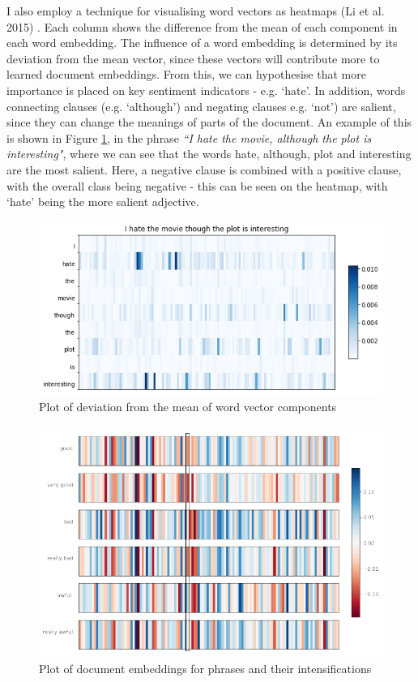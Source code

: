 \documentclass[a4paper]{article}
\begin{document}
\begin{multicols}{2}
I also employ a technique for visualising word vectors as heatmaps (Li et al. 2015) \cite{viz}. Each column shows the difference from the mean of each component in each word embedding. The influence of a word embedding is determined by its deviation from the mean vector, since these vectors will contribute more to learned document embeddings. From this, we can hypothesise that more importance is placed on key sentiment indicators - e.g. `hate'. In addition, words connecting clauses (e.g. `although') and negating clauses e.g. `not') are salient, since they can change the meanings of parts of the document. An example of this is shown in Figure \ref{fig:var-fig}, in the phrase \textit{``I hate the movie, although the plot is interesting"}, where we can see that the words hate, although, plot and interesting are the most salient. Here, a negative clause is combined with a positive clause, with the overall class being negative - this can be seen on the heatmap, with `hate' being the more salient adjective.

\begin{figure}
  \centering
  \includegraphics[width=\linewidth,keepaspectratio]{figs/variance_plot.png}
  \caption{Plot of deviation from the mean of word vector components}
  \label{fig:var-fig}
\end{figure}

\begin{figure}
  \centering
  \includegraphics[width=\textwidth,height=\textheight,keepaspectratio]{figs/intense1.png}
  \caption{Plot of document embeddings for phrases and their intensifications}
  \label{fig:intense-fig}
\end{figure}



\end{multicols}
\end{document}
